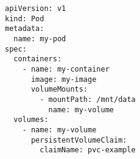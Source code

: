 \begin{verbatim}
apiVersion: v1
kind: Pod
metadata:
  name: my-pod
spec:
  containers:
    - name: my-container
      image: my-image
      volumeMounts:
        - mountPath: /mnt/data
          name: my-volume
  volumes:
    - name: my-volume
      persistentVolumeClaim:
        claimName: pvc-example
\end{verbatim}